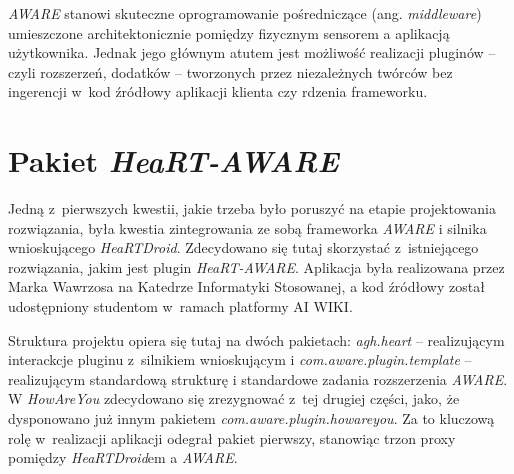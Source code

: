 \textit{AWARE} stanowi skuteczne oprogramowanie pośredniczące (ang. \textit{middleware}) umieszczone architektonicznie pomiędzy fizycznym sensorem a aplikacją użytkownika. Jednak jego głównym atutem jest możliwość realizacji pluginów -- czyli rozszerzeń, dodatków -- tworzonych przez niezależnych twórców bez ingerencji w~kod źródłowy aplikacji klienta czy rdzenia frameworku\cite{AwareFramework}. 



\section{Pakiet \textit{HeaRT-AWARE}}
\label{sec:pakietHeartAware}

Jedną z~pierwszych kwestii, jakie trzeba było poruszyć na etapie projektowania rozwiązania, była kwestia zintegrowania ze sobą frameworka \textit{AWARE} i silnika wnioskującego \textit{HeaRTDroid}. Zdecydowano się tutaj skorzystać z~istniejącego rozwiązania, jakim jest plugin \textit{HeaRT-AWARE}. Aplikacja była realizowana przez Marka Wawrzosa na Katedrze Informatyki Stosowanej, a kod źródłowy został udostępniony studentom w~ramach platformy AI WIKI\cite{heartaware}.

Struktura projektu opiera się tutaj na dwóch pakietach: \textit{agh.heart} -- realizującym interackcje pluginu z~silnikiem wnioskującym i \textit{com.aware.plugin.template} -- realizującym standardową strukturę i standardowe zadania rozszerzenia \textit{AWARE}. W \textit{HowAreYou} zdecydowano się zrezygnować z~tej drugiej części, jako, że dysponowano już innym pakietem \textit{com.aware.plugin.howareyou}. Za to kluczową rolę w~realizacji aplikacji odegrał pakiet pierwszy, stanowiąc trzon proxy pomiędzy \textit{HeaRTDroid}em a \textit{AWARE}.

